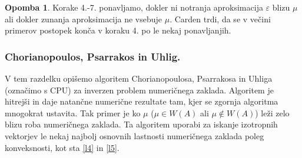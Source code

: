 \documentclass[12pt,a4paper]{amsart}
\theoremstyle{definition}
\newtheorem{opomba}[definicija]{Opomba}
\theoremstyle{plain}
\begin{document}
\begin{opomba}
Korake 4.-7. ponavljamo, dokler ni notranja aproksimacija $\varepsilon$ blizu $\mu$ ali dokler zunanja aproksimacija ne vsebuje $\mu$. Carden trdi, da se v večini primerov postopek konča v koraku 4. po le nekaj ponavljanjih.\\
\end{opomba}
\subsubsection{Chorianopoulos, Psarrakos in Uhlig.}
V tem razdelku opišemo algoritem Chorianopoulosa, Psarrakosa in Uhliga (označimo s CPU) za inverzen problem numeričnega zaklada.
Algoritem je hitrejši in daje natančne numerične rezultate tam, kjer se zgornja algoritma mnogokrat ustavita. Tak primer je ko $\mu$ ($\mu \in W(A)$ ali $\mu \not\in W(A)$) leži zelo blizu roba numeričnega zaklada. Ta algoritem uporabi za iskanje izotropnih vektorjev le nekaj najbolj osnovnih lastnosti numeričnega zaklada poleg konveksnosti, kot sta \ref{l4} in \ref{l5}.\\
\end{document}
